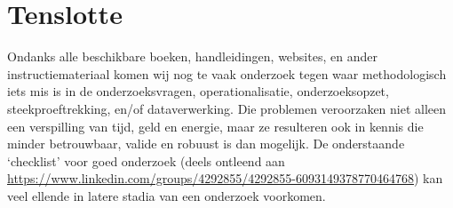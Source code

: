\documentclass[
]{book}
\begin{document}
\section{Tenslotte}\label{tenslotte}

Ondanks alle beschikbare boeken, handleidingen, websites, en ander
instructiemateriaal komen wij nog te vaak onderzoek tegen waar
methodologisch iets mis is in de onderzoeksvragen, operationalisatie,
onderzoeksopzet, steekproeftrekking, en/of dataverwerking. Die problemen
veroorzaken niet alleen een verspilling van tijd, geld en energie, maar
ze resulteren ook in kennis die minder betrouwbaar, valide en robuust is
dan mogelijk. De onderstaande `checklist' voor goed onderzoek (deels
ontleend aan
\url{https://www.linkedin.com/groups/4292855/4292855-6093149378770464768})
kan veel ellende in latere stadia van een onderzoek voorkomen.
\end{document}
